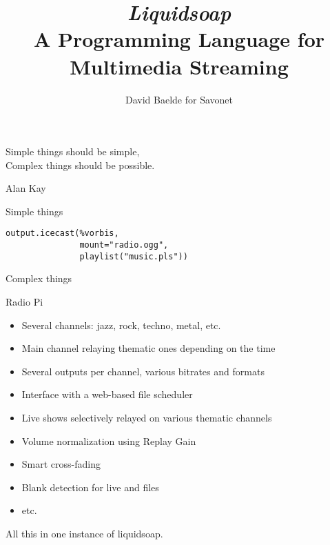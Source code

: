 \documentclass{beamer}
\title{\emph{\LARGE Liquidsoap} \\
  A Programming Language for \\ Multimedia Streaming}
\date{David Baelde for Savonet} %
\renewcommand{\emph}[1]{\alert{#1}}
\begin{document}
\begin{frame}
  \maketitle
\end{frame}

\begin{frame}

\vfill

\begin{center}
{\LARGE
Simple things should be simple, \\[1ex]
Complex things should be possible.
}
\begin{flushright}
Alan Kay \hspace{0.5cm} ~
\end{flushright}
\end{center}

\vfill

\end{frame}


\begin{frame}[fragile]{Simple things}

\begin{lstlisting}
output.icecast(%vorbis,
               mount="radio.ogg",
               playlist("music.pls"))
\end{lstlisting}

\end{frame}


\begin{frame}{Complex things}

\begin{block}{Radio Pi}
\begin{itemize}
\item \emph{Several channels}: jazz, rock, techno, metal, etc.
\item Main channel relaying thematic ones depending on the time
\item \emph{Several outputs per channel}, various bitrates and formats
\item Interface with a web-based \emph{file scheduler}
\item \emph{Live shows} selectively relayed on various thematic channels
\item Volume normalization using \emph{Replay Gain}
\item Smart \emph{cross-fading}
\item \emph{Blank detection} for live and files
\item etc.
\end{itemize}
All this in \emph{one instance} of liquidsoap.
\end{block}

\end{frame}
\end{document}
